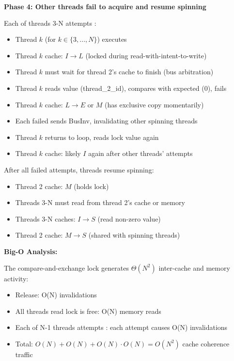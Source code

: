 \documentclass{article}
\newenvironment{answer}
{\color{blue}}
{\normalfont}
\begin{document}
\begin{enumerate}
\begin{enumerate}
\begin{answer}
                        \textbf{Phase 4: Other threads fail to acquire and resume spinning}

                        Each of threads 3-N attempts :
                        \begin{itemize}
                            \item Thread $k$ (for $k \in \{3,...,N\}$) executes 
                            \item Thread $k$ cache: $I \to L$ (locked during read-with-intent-to-write)
                            \item Thread $k$ must wait for thread 2's cache to finish (bus arbitration)
                            \item Thread $k$ reads value (thread\_2\_id), compares with expected (0), fails
                            \item Thread $k$ cache: $L \to E$ or $M$ (has exclusive copy momentarily)
                            \item Each failed  sends BusInv, invalidating other spinning threads
                            \item Thread $k$ returns to  loop, reads lock value again
                            \item Thread $k$ cache: likely $I$ again after other threads'  attempts
                        \end{itemize}

                        After all failed attempts, threads resume spinning:
                        \begin{itemize}
                            \item Thread 2 cache: $M$ (holds lock)
                            \item Threads 3-N must read from thread 2's cache or memory
                            \item Threads 3-N caches: $I \to S$ (read non-zero value)
                            \item Thread 2 cache: $M \to S$ (shared with spinning threads)
                        \end{itemize}

                        \textbf{Big-O Analysis:}

                        The compare-and-exchange lock generates $\Theta(N^2)$ inter-cache and memory activity:
                        \begin{itemize}
                            \item Release: O(N) invalidations
                            \item All threads read lock is free: O(N) memory reads
                            \item Each of N-1 threads attempts : each attempt causes O(N) invalidations
                            \item Total: $O(N) + O(N) + O(N) \cdot O(N) = O(N^2)$ cache coherence traffic
                        \end{itemize}


\end{answer}
\end{enumerate}
\end{enumerate}
\end{document}
